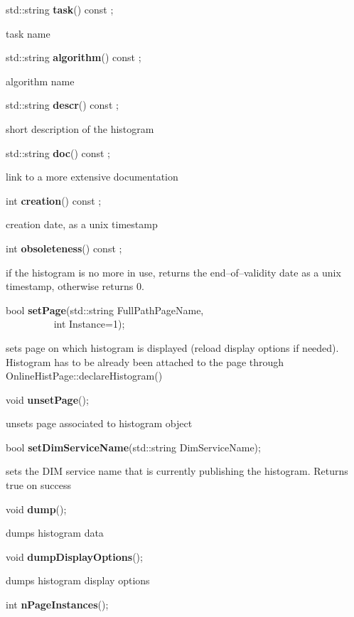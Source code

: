 \item    std::string {\bf task}() const ;

 task name


\item    std::string {\bf algorithm}() const ;

 algorithm name


\item    std::string {\bf descr}() const ;

 short description of the histogram


\item    std::string {\bf doc}() const ;

 link to a more extensive documentation


\item    int {\bf creation}() const ;

 creation date, as a unix timestamp


\item    int {\bf obsoleteness}() const ;

 if the histogram is no more in use, returns the end--of--validity date
 as a unix timestamp, otherwise returns 0.


\item    bool {\bf setPage}(std::string FullPathPageName,\\\mbox{}~~~~~~~~~
	       int Instance=1);

 sets page on which histogram is displayed (reload display options if needed). Histogram has to be already
 been attached to the page through OnlineHistPage::declareHistogram()


\item    void {\bf unsetPage}();


 unsets page associated to histogram object


\item    bool {\bf setDimServiceName}(std::string DimServiceName);


 sets the DIM service name that is currently publishing the histogram. Returns true on success


\item    void {\bf dump}();


 dumps histogram data


\item    void {\bf dumpDisplayOptions}();


 dumps histogram display options


\item    int {\bf nPageInstances}();


